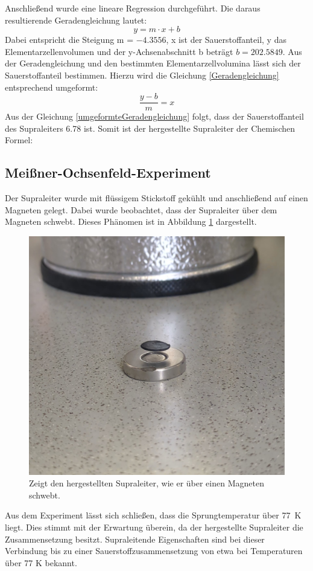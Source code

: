 \documentclass[12pt, a4paper]{article}
\begin{document}
\noindent
Anschließend wurde eine lineare Regression durchgeführt. Die daraus resultierende Geradengleichung lautet:
\begin{equation}
  y= m \cdot x + b
  \label{Geradengleichung}
\end{equation}
Dabei entspricht die Steigung m = $-4.3556$, x ist der Sauerstoffanteil, y das Elementarzellenvolumen und der y-Achsenabschnitt b beträgt $b = 202.5849$. Aus der Geradengleichung und den bestimmten Elementarzellvolumina lässt sich der Sauerstoffanteil bestimmen.
Hierzu wird die Gleichung \ref{Geradengleichung} entsprechend umgeformt:
\begin{equation}
  \frac{y - b}{m} = x
  \label{umgeformteGeradengleichung}
\end{equation}
Aus der Gleichung \ref{umgeformteGeradengleichung} folgt, dass der Sauerstoffanteil des Supraleiters 6.78 ist. Somit ist der hergestellte Supraleiter der Chemischen Formel:

\begin{center}
\end{center}

\newpage
\subsection{Meißner-Ochsenfeld-Experiment}
Der Supraleiter wurde mit flüssigem Stickstoff gekühlt und anschließend auf einen Magneten gelegt. Dabei wurde beobachtet, dass der Supraleiter über dem Magneten schwebt. Dieses Phänomen ist in Abbildung \ref{fliegend} dargestellt.
\begin{figure}[!h]
  \centering
  \includegraphics[width=0.5\linewidth]{sipraleiter.jpg}
  \caption{Zeigt den hergestellten Supraleiter, wie er über einen Magneten schwebt.}
  \label{fliegend}
\end{figure}
Aus dem Experiment lässt sich schließen, dass die Sprungtemperatur über \mbox{77 K} liegt. Dies stimmt mit der Erwartung überein, da der hergestellte Supraleiter die Zusammensetzung  besitzt. Supraleitende Eigenschaften sind bei dieser Verbindung bis zu einer Sauerstoffzusammensetzung von etwa  bei Temperaturen über 77 K bekannt. \cite{Skript}
\end{document}
